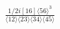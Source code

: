 \documentclass[varwidth, border=5pt]{standalone}
\begin{document}
\begin{my}
$\begin{gathered}
\scriptscriptstyle\frac{1/2i[16]\langle56\rangle^3}{\langle12\rangle\langle23\rangle\langle34\rangle\langle45\rangle}
\end{gathered}$
\end{my}
\end{document}
